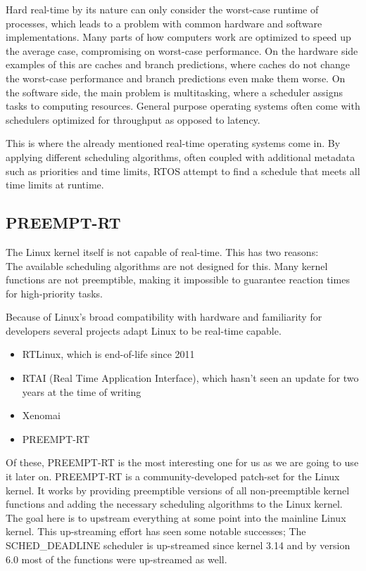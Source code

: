 Hard real-time by its nature can only consider the worst-case runtime of processes,
which leads to a problem with common hardware and software implementations.
Many parts of how computers work are optimized to speed up the average case, compromising on worst-case performance.
On the hardware side examples of this are caches and branch predictions, where caches do not change the worst-case performance and branch predictions even make them worse.
On the software side, the main problem is multitasking, where a scheduler assigns tasks to computing resources.
General purpose operating systems often come with schedulers optimized for throughput as opposed to latency.

This is where the already mentioned real-time operating systems come in.
By applying different scheduling algorithms,
often coupled with additional metadata such as priorities and time limits,
RTOS attempt to find a schedule that meets all time limits at runtime.

\subsection{PREEMPT-RT}
\label{sec:background:bm_vs_os:preempt_rt}

The Linux kernel itself is not capable of real-time.
This has two reasons:\\
The available scheduling algorithms are not designed for this.
Many kernel functions are not preemptible, making it impossible to guarantee reaction times for high-priority tasks.

Because of Linux's broad compatibility with hardware and familiarity for developers several projects adapt Linux to be real-time capable.
\begin{itemize}
    \item RTLinux, which is end-of-life since 2011
    \item RTAI (Real Time Application Interface), which hasn't seen an update for two years at the time of writing
    \item Xenomai
    \item PREEMPT-RT
\end{itemize}

Of these, PREEMPT-RT is the most interesting one for us as we are going to use it later on.
PREEMPT-RT is a community-developed patch-set for the Linux kernel.
It works by providing preemptible versions of all non-preemptible kernel functions
and adding the necessary scheduling algorithms to the Linux kernel.
The goal here is to upstream everything at some point into the mainline Linux kernel.
This up-streaming effort has seen some notable successes;
The SCHED\_DEADLINE scheduler is up-streamed since kernel 3.14 and by version 6.0 most of the functions were up-streamed as well.

